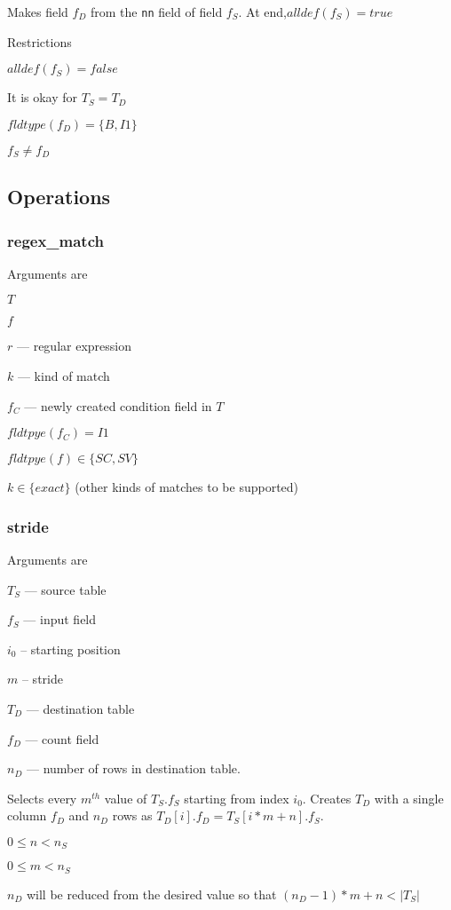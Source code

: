 Makes field \(f_D\) from the {\tt nn} field of field \(f_S\). At
end,\(alldef(f_S) = true\)

Restrictions
\be
\item \(alldef(f_S) = false\)
\item It is okay for \(T_S = T_D\)
\item \(fldtype(f_D) = \{B, I1\} \) 
\item \(f_S \neq f_D\)
\ee


\subsection{Operations}
\subsubsection{regex\_match}
\label{regex_match}

Arguments are
\be
\item \(T\)
\item \(f\)
\item \(r\) --- regular expression
\item \(k\) --- kind of match 
\item \(f_C\) --- newly created condition field in \(T\)
\ee 

\be
\item \(fldtpye(f_C) = I1\)
\item \(fldtpye(f) \in \{SC, SV\}\)
\item \(k \in \{exact\}\) (other kinds of matches to be supported)
\ee

\subsubsection{stride}
\label{stride}
Arguments are 
\be
\item \(T_S\) --- source table
\item \(f_S\) --- input field 
\item \(i_0\) --  starting position
\item \(m\)   --  stride
\item \(T_D\) --- destination table
\item \(f_D\) --- count field 
\item \(n_D\) --- number of rows in destination table.
\ee

Selects every \(m^{th}\) value of \(T_S.f_S\) starting from index \(i_0\).
Creates \(T_D\) with a single column \(f_D\) and \(n_D\) rows as
\(T_D[i].f_D = T_S[i*m + n].f_S\).
\bi
\item \(0 \leq n < n_S\)
\item \(0 \leq m < n_S\)
\item 
\(n_D\) will be reduced from the desired value so that
\((n_D-1)*m + n < |T_S|\)
\ei

